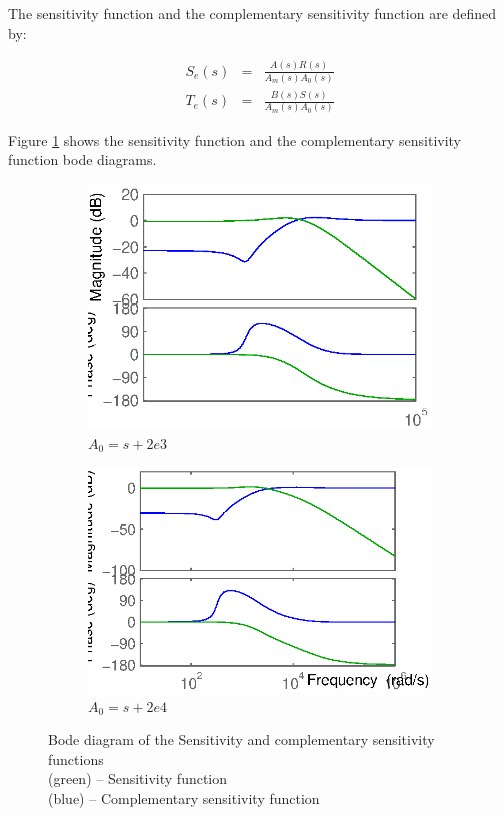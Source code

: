 The sensitivity function and the complementary sensitivity function are defined by:

$$\begin{array}{rcl}
   S_e(s) & = & \frac{A(s)R(s)}{A_m(s)A_0(s)} \\
   T_e(s) & = & \frac{B(s)S(s)}{A_m(s)A_0(s)}
  \end{array}$$

Figure \ref{sensitivity} shows the sensitivity function and the complementary sensitivity function bode diagrams.

\begin{figure}[hb]
  \centering
  \begin{subfigure}[b]{\linewidth}
   \includegraphics[width=\columnwidth]{fig/bode_SeTe_designAm.eps}
   \caption{$A_0 = s+2e3$}
  \end{subfigure}
  \begin{subfigure}[b]{\linewidth}
  \includegraphics[width=\columnwidth]{fig/bode_SeTe_desginA0.eps}
   \caption{$A_0 = s + 2e4$}
  \end{subfigure}
 \caption{Bode diagram of the Sensitivity and complementary sensitivity functions \\ (green) -- Sensitivity function \\ (blue) -- Complementary sensitivity function }
 \label{sensitivity}
\end{figure}


